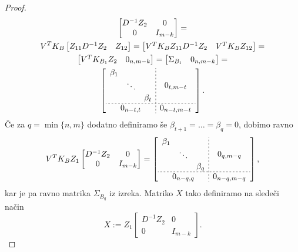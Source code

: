 \documentclass[mat1]{article}
\theoremstyle{definition}
\begin{document}
\begin{proof}
\begin{gather*}
\begin{bmatrix}
D^{-1} Z_2 & 0\\ 
0 & I_{m-k}
\end{bmatrix} = \\
V^T K_B
\begin{bmatrix}
 Z_{11} D^{-1} Z_2 & Z_{12} 
\end{bmatrix} =
\begin{bmatrix}
V^T K_B Z_{11} D^{-1} Z_2 & V^T K_B Z_{12} 
\end{bmatrix} = \\
\begin{bmatrix}
V^T K_{B_1} Z_2 & 0_{n, m-k} 
\end{bmatrix} =
\begin{bmatrix}
\Sigma_{B_t} & 0_{n, m-k} 
\end{bmatrix} = \\
\left[
\begin{array}{c;{2pt/2pt}c}
\begin{matrix}
\beta_1 & & \\
 & \ddots & \\
 & & \beta_t
\end{matrix} & 0_{t, m - t}
 \\ \hdashline[2pt/2pt]
0_{n-t, t} & 0_{n-t, m-t}
\end{array} \right]
\text{.}
\end{gather*}
Če za $q = \min\{n,m\}$ dodatno definiramo še $\beta_{t+1} = \ldots = \beta_{q} = 0$, dobimo ravno
\begin{gather*}
V^T K_B Z_1
\begin{bmatrix}
D^{-1} Z_2 & 0\\ 
0 & I_{m-k}
\end{bmatrix} = 
\left[
\begin{array}{c;{2pt/2pt}c}
\begin{matrix}
\beta_1 & & \\
 & \ddots & \\
 & & \beta_q
\end{matrix} & 0_{q, m - q}
 \\ \hdashline[2pt/2pt]
0_{n-q, q} & 0_{n-q, m-q}
\end{array} \right]
\text{,}
\end{gather*}
kar je pa ravno matrika $\Sigma_{B_q}$ iz izreka. Matriko $X$ tako definiramo na sledeči način
$$ X := Z_1 
\begin{bmatrix}
D^{-1} Z_2 & 0\\ 
0 & I_{m-k}
\end{bmatrix}
\text{.}$$


\end{proof}
\end{document}

